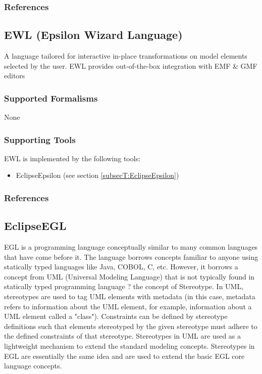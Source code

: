 \subsubsection{References}





\subsection{EWL (Epsilon Wizard Language)}
\label{subsecL:EWL}


A language tailored for interactive in-place transformations on model elements selected by the user. EWL provides out-of-the-box integration with EMF \& GMF editors

\subsubsection{Supported Formalisms}

None


\subsubsection{Supporting Tools}

EWL is implemented by the following tools:
\begin{itemize}
	\item EclipseEpsilon (see section \ref{subsecT:EclipseEpsilon})
\end{itemize}


\subsubsection{References}


\subsection{EclipseEGL}
\label{subsecL:EclipseEGL}


EGL is a programming language conceptually similar to many common languages that have come before it. The language borrows concepts familiar to anyone using statically typed languages like Java, COBOL, C, etc. However, it borrows a concept from UML (Universal Modeling Language) that is not typically found in statically typed programming language ? the concept of Stereotype. In UML, stereotypes are used to tag UML elements with metadata (in this case, metadata refers to information about the UML element, for example, information about a UML element called a "class"). Constraints can be defined by stereotype definitions such that elements stereotyped by the given stereotype must adhere to the defined constraints of that stereotype. Stereotypes in UML are used as a lightweight mechanism to extend the standard modeling concepts. Stereotypes in EGL are essentially the same idea and are used to extend the basic EGL core language concepts.

